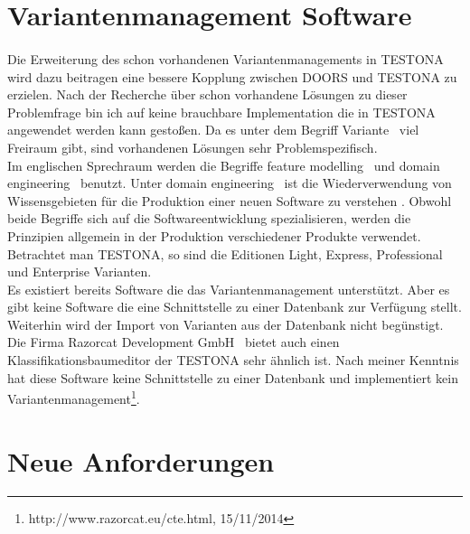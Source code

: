 \newpage
\section{Variantenmanagement Software}
\paragraph{}
Die Erweiterung des schon vorhandenen Variantenmanagements in TESTONA wird dazu beitragen eine bessere Kopplung zwischen DOORS und TESTONA zu erzielen. Nach der Recherche über schon vorhandene Lösungen zu dieser Problemfrage bin ich auf keine brauchbare Implementation die in TESTONA angewendet werden kann gestoßen. Da es unter dem Begriff \glqq Variante\grqq~ viel Freiraum gibt, sind vorhandenen Lösungen sehr Problemspezifisch.\\


Im englischen Sprechraum werden die Begriffe \glqq feature modelling\grqq~ und \glqq domain engineering\grqq~ benutzt. Unter \glqq domain engineering\grqq~ ist die Wiederverwendung von Wissensgebieten für die Produktion einer neuen Software zu verstehen \cite{DomainEng}. Obwohl beide Begriffe sich auf die Softwareentwicklung spezialisieren, werden die Prinzipien allgemein in der Produktion verschiedener Produkte verwendet. Betrachtet man TESTONA, so sind die Editionen Light, Express, Professional und Enterprise Varianten.\\


Es existiert bereits Software die das Variantenmanagement unterstützt. Aber es gibt keine Software die eine Schnittstelle zu einer Datenbank zur Verfügung stellt. Weiterhin wird der Import von Varianten aus der Datenbank nicht begünstigt.\\


Die Firma \glqq Razorcat Development GmbH\grqq~ bietet auch einen Klassifikationsbaumeditor der TESTONA sehr ähnlich ist. Nach meiner Kenntnis hat diese Software keine Schnittstelle zu einer Datenbank und implementiert kein Variantenmanagement\footnote{http://www.razorcat.eu/cte.html, 15/11/2014}.



\newpage
\section{Neue Anforderungen}
